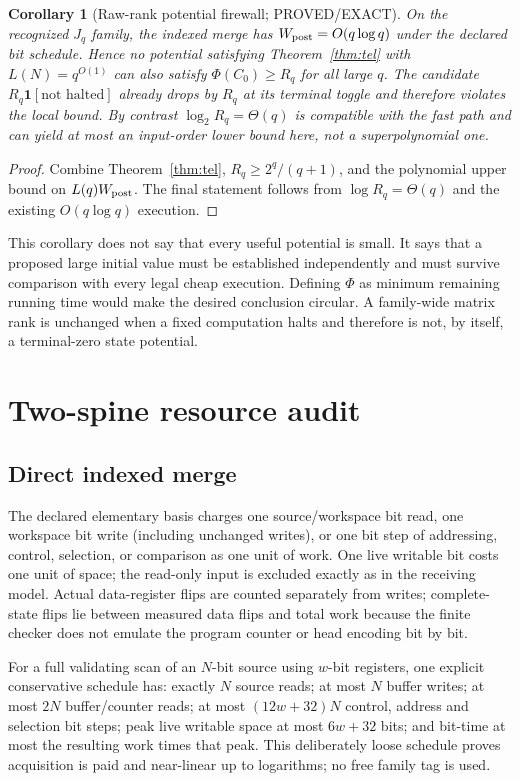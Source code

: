 \documentclass[11pt]{article}
\newtheorem{corollary}[theorem]{Corollary}
\begin{document}
\begin{corollary}[Raw-rank potential firewall; PROVED/EXACT]
On the recognized $J_q$ family, the indexed merge has
$W_{\rm post}=O(q\log q)$ under the declared bit schedule.  Hence no
potential satisfying Theorem~\ref{thm:tel} with
$L(N)=q^{O(1)}$ can also satisfy $\Phi(C_0)\ge R_q$ for all large $q$.
The candidate $R_q\mathbf1[\text{not halted}]$ already drops by $R_q$ at
its terminal toggle and therefore violates the local bound.  By contrast
$\log_2R_q=\Theta(q)$ is compatible with the fast path and can yield at most
an input-order lower bound here, not a superpolynomial one.
\end{corollary}
\begin{proof}
Combine Theorem~\ref{thm:tel}, $R_q\ge2^q/(q+1)$, and the polynomial
upper bound on $L(q)W_{\rm post}$.  The final statement follows from
$\log R_q=\Theta(q)$ and the existing $O(q\log q)$ execution.
\end{proof}

This corollary does not say that every useful potential is small.  It says
that a proposed large initial value must be established independently and
must survive comparison with every legal cheap execution.  Defining
$\Phi$ as minimum remaining running time would make the desired conclusion
circular.  A family-wide matrix rank is unchanged when a fixed computation
halts and therefore is not, by itself, a terminal-zero state potential.

\section{Two-spine resource audit}
\subsection*{Direct indexed merge}
The declared elementary basis charges one source/workspace bit read, one
workspace bit write (including unchanged writes), or one bit step of
addressing, control, selection, or comparison as one unit of work.  One live
writable bit costs one unit of space; the read-only input is excluded exactly
as in the receiving model.  Actual data-register flips are counted
separately from writes; complete-state flips lie between measured data flips
and total work because the finite checker does not emulate the program
counter or head encoding bit by bit.

For a full validating scan of an $N$-bit source using $w$-bit registers, one
explicit conservative schedule has: exactly $N$ source reads; at most $N$
buffer writes; at most $2N$ buffer/counter reads; at most
$(12w+32)N$ control, address and selection bit steps; peak live writable
space at most $6w+32$ bits; and bit-time at most the resulting work times
that peak.  This deliberately loose schedule proves acquisition is paid and
near-linear up to logarithms; no free family tag is used.
\end{document}
